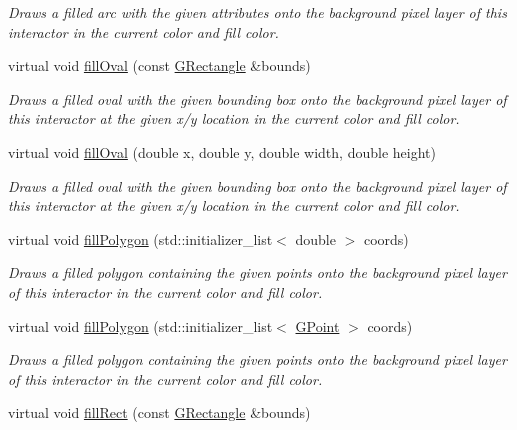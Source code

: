 \begin{DoxyCompactItemize}
\begin{DoxyCompactList}\small\item\em Draws a filled arc with the given attributes onto the background pixel layer of this interactor in the current color and fill color. \end{DoxyCompactList}\item 
virtual void \mbox{\hyperlink{classsgl_1_1GDrawingSurface_a1ea6e48d59fb588797dba4deab1397e0}{fill\+Oval}} (const \mbox{\hyperlink{structsgl_1_1GRectangle}{G\+Rectangle}} \&bounds)
\begin{DoxyCompactList}\small\item\em Draws a filled oval with the given bounding box onto the background pixel layer of this interactor at the given x/y location in the current color and fill color. \end{DoxyCompactList}\item 
virtual void \mbox{\hyperlink{classsgl_1_1GDrawingSurface_a28c700c82f31cd328a4629273420ee61}{fill\+Oval}} (double x, double y, double width, double height)
\begin{DoxyCompactList}\small\item\em Draws a filled oval with the given bounding box onto the background pixel layer of this interactor at the given x/y location in the current color and fill color. \end{DoxyCompactList}\item 
virtual void \mbox{\hyperlink{classsgl_1_1GDrawingSurface_a15f8c1c4409ef51c1a30a92a195b8f66}{fill\+Polygon}} (std\+::initializer\+\_\+list$<$ double $>$ coords)
\begin{DoxyCompactList}\small\item\em Draws a filled polygon containing the given points onto the background pixel layer of this interactor in the current color and fill color. \end{DoxyCompactList}\item 
virtual void \mbox{\hyperlink{classsgl_1_1GDrawingSurface_a31822d59786156ebf1cc3b2f7fb70330}{fill\+Polygon}} (std\+::initializer\+\_\+list$<$ \mbox{\hyperlink{structsgl_1_1GPoint}{G\+Point}} $>$ coords)
\begin{DoxyCompactList}\small\item\em Draws a filled polygon containing the given points onto the background pixel layer of this interactor in the current color and fill color. \end{DoxyCompactList}\item 
virtual void \mbox{\hyperlink{classsgl_1_1GDrawingSurface_ae6582295003bf2488836b1993dadbad7}{fill\+Rect}} (const \mbox{\hyperlink{structsgl_1_1GRectangle}{G\+Rectangle}} \&bounds)

\end{DoxyCompactItemize}

